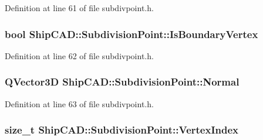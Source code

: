 Definition at line 61 of file subdivpoint.\-h.

\hypertarget{classShipCAD_1_1SubdivisionPoint_ad78eae7c6c9a35c329f1137817e10a8d}{
\subsubsection[{Is\-Boundary\-Vertex}]{\setlength{\rightskip}{0pt plus 5cm}bool Ship\-C\-A\-D\-::\-Subdivision\-Point\-::\-Is\-Boundary\-Vertex\hspace{0.3cm}{\ttfamily [read]}}}\label{classShipCAD_1_1SubdivisionPoint_ad78eae7c6c9a35c329f1137817e10a8d}


Definition at line 62 of file subdivpoint.\-h.

\hypertarget{classShipCAD_1_1SubdivisionPoint_aeaf744ea3deb2bdc55e9e90d3e8b58a2}{
\subsubsection[{Normal}]{\setlength{\rightskip}{0pt plus 5cm}Q\-Vector3\-D Ship\-C\-A\-D\-::\-Subdivision\-Point\-::\-Normal\hspace{0.3cm}{\ttfamily [read]}}}\label{classShipCAD_1_1SubdivisionPoint_aeaf744ea3deb2bdc55e9e90d3e8b58a2}


Definition at line 63 of file subdivpoint.\-h.

\hypertarget{classShipCAD_1_1SubdivisionPoint_ad4ec233273e3bc788d2dd6736530d645}{
\subsubsection[{Vertex\-Index}]{\setlength{\rightskip}{0pt plus 5cm}size\-\_\-t Ship\-C\-A\-D\-::\-Subdivision\-Point\-::\-Vertex\-Index\hspace{0.3cm}{\ttfamily [read]}}}\label{classShipCAD_1_1SubdivisionPoint_ad4ec233273e3bc788d2dd6736530d645}


